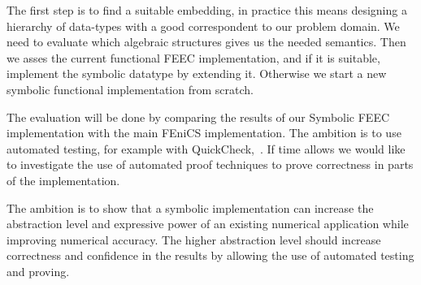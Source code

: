 \documentclass{scrartcl}
\begin{document}

The first step is to find a suitable embedding, in practice this means
designing a hierarchy of data-types with a good correspondent to our problem
domain.  We need to evaluate which algebraic structures gives us the needed
semantics. Then we asses the current functional FEEC implementation, and if
it is suitable, implement the symbolic datatype by extending it. Otherwise we
start a new symbolic functional implementation from scratch.

The evaluation will be done by comparing the results of our Symbolic FEEC
implementation with the main FEniCS implementation.
The ambition is to use automated testing, for example with
QuickCheck,~\cite{claessen_quickcheck_2000}.
If time allows we would like to investigate the use of automated proof
techniques to prove correctness in parts of the implementation.


The ambition is to show that a symbolic implementation can increase the
abstraction level and expressive power of an existing numerical application
while improving numerical accuracy. The higher abstraction level should increase
correctness and confidence in the results by allowing the use of automated
testing and proving.








\end{document}

